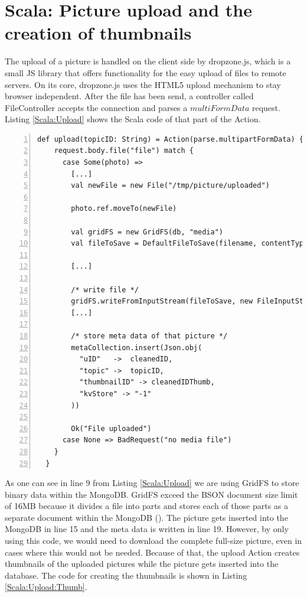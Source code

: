\section{Scala: Picture upload and the creation of thumbnails}
The upload of a picture is handled on the client side by dropzone.js, which is a small \ac{JS} library that offers functionality for the easy upload of files to remote servers. On its core, dropzone.js uses the \ac{HTML5} upload mechanism to stay  browser independent. After the file has been send, a controller called FileController accepts the connection and parses a $multiFormData$ request. Listing \ref{Scala:Upload} shows the Scala code of that part of the Action.

\begin{lstlisting}[numbers=left,caption={Snippet of the upload Action of the FileController for uploading pictures},label=Scala:Upload,frame=tlbr,breaklines]
def upload(topicID: String) = Action(parse.multipartFormData) { request =>
    request.body.file("file") match {
      case Some(photo) =>
        [...]
        val newFile = new File("/tmp/picture/uploaded")

        photo.ref.moveTo(newFile)

        val gridFS = new GridFS(db, "media")
        val fileToSave = DefaultFileToSave(filename, contentType)

        [...]

        /* write file */
        gridFS.writeFromInputStream(fileToSave, new FileInputStream(newFile))
        [...]

        /* store meta data of that picture */
        metaCollection.insert(Json.obj(
          "uID"   ->  cleanedID,
          "topic" ->  topicID,
          "thumbnailID" -> cleanedIDThumb,
          "kvStore" -> "-1"
        ))

        Ok("File uploaded")
      case None => BadRequest("no media file")
    }
  }
\end{lstlisting}

As one can see in line 9 from Listing \ref{Scala:Upload} we are using GridFS to store binary data within the MongoDB. GridFS exceed the \ac{BSON} document size limit of 16MB because it divides a file into parts and stores each of those parts as a separate document within the MongoDB (\cite{gridfs}). The picture gets inserted into the MongoDB in line 15 and the meta data is written in line 19. However, by only using this code, we would need to download the complete full-size picture, even in cases where this would not be needed.  Because of that, the upload Action creates thumbnails of the uploaded pictures while the picture gets inserted into the database. The code for creating the thumbnails is shown in Listing \ref{Scala:Upload:Thumb}.

